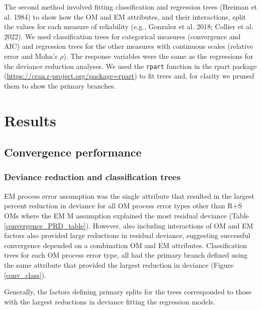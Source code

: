 \documentclass[
  12pt,
]{article}
\begin{document}
The second method involved fitting classification and regression trees
(Breiman et al. 1984) to show how the OM and EM attributes, and their
interactions, split the values for each measure of reliability (e.g.,
Gonzalez et al. 2018; Collier et al. 2022). We used classification trees
for categorical measures (convergence and AIC) and regression trees for
the other measures with continuous scales (relative error and Mohn's
\(\rho\)). The response variables were the same as the regressions for
the deviance reduction analyses. We used the \verb|rpart| function in
the rpart package (\url{https://cran.r-project.org/package=rpart}) to
fit trees and, for clarity we pruned them to show the primary branches.

\section*{Results}\label{results}

\subsection*{Convergence performance}\label{convergence-performance}

\subsubsection*{Deviance reduction and classification
trees}\label{deviance-reduction-and-classification-trees}

EM process error assumption was the single attribute that resulted in
the largest percent reduction in deviance for all OM process error types
other than R+S OMs where the EM M assumption explained the most residual
deviance (Table \ref{convergence_PRD_table}). However, also including
interactions of OM and EM factors also provided large reductions in
residual deviance, suggesting successful convergence depended on a
combination OM and EM attributes. Classification trees for each OM
process error type, all had the primary branch defined using the same
attribute that provided the largest reduction in deviance (Figure
\ref{conv_class}).

Generally, the factors defining primary splits for the trees
corresponded to those with the largest reductions in deviance fitting
the regression models.
\end{document}
